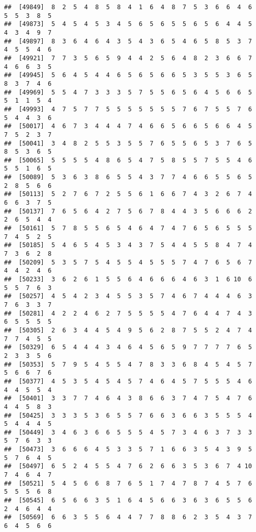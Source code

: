 \documentclass[
]{book}
\begin{document}
\begin{verbatim}
##  [49849]  8  2  5  4  8  5  8  4  1  6  4  8  7  5  3  6  6  4  6  5  5  3  8  5
##  [49873]  5  4  5  4  5  3  4  5  6  5  6  5  5  6  5  6  4  4  5  4  3  4  9  7
##  [49897]  8  3  6  4  6  4  3  5  4  3  6  5  4  6  5  8  5  3  7  4  5  5  4  6
##  [49921]  7  7  3  5  6  5  9  4  4  2  5  6  4  8  2  3  6  6  7  4  6  6  3  5
##  [49945]  5  6  4  5  4  4  6  5  6  5  6  6  5  3  5  5  3  6  5  8  3  7  4  6
##  [49969]  5  5  4  7  3  3  3  5  7  5  5  6  5  6  4  5  6  6  5  5  1  1  5  4
##  [49993]  4  7  5  7  7  5  5  5  5  5  5  5  7  6  7  5  5  7  6  5  4  4  3  6
##  [50017]  4  6  7  3  4  4  4  7  4  6  6  5  6  6  5  6  6  4  5  7  5  2  3  7
##  [50041]  3  4  8  2  5  5  3  5  5  7  6  5  5  6  5  3  7  6  5  8  5  3  6  5
##  [50065]  5  5  5  5  4  8  6  5  4  7  5  8  5  5  7  5  5  4  6  5  5  1  6  5
##  [50089]  5  3  6  3  8  6  5  5  4  3  7  7  4  6  6  5  5  6  5  2  8  5  6  6
##  [50113]  5  2  7  6  7  2  5  5  6  1  6  6  7  4  3  2  6  7  4  6  6  3  7  5
##  [50137]  7  6  5  6  4  2  7  5  6  7  8  4  4  3  5  6  6  6  2  2  6  5  4  4
##  [50161]  5  7  8  5  5  6  5  4  6  4  7  4  7  6  5  6  5  5  5  7  4  5  2  5
##  [50185]  5  4  6  5  4  5  3  4  3  7  5  4  4  5  5  8  4  7  4  7  3  6  2  8
##  [50209]  5  3  5  7  5  4  5  5  4  5  5  5  7  4  7  6  5  6  7  4  4  2  4  6
##  [50233]  3  6  2  6  1  5  5  6  4  6  6  6  4  6  3  1  6 10  6  5  5  7  6  3
##  [50257]  4  5  4  2  3  4  5  5  3  5  7  4  6  7  4  4  4  6  3  7  6  3  3  7
##  [50281]  4  2  2  4  6  2  7  5  5  5  5  4  7  6  4  4  7  4  3  6  5  5  5  5
##  [50305]  2  6  3  4  4  5  4  9  5  6  2  8  7  5  5  2  4  7  4  7  7  4  5  5
##  [50329]  6  5  4  4  4  3  4  6  4  5  6  5  9  7  7  7  7  6  5  2  3  3  5  6
##  [50353]  5  7  9  5  4  5  5  4  7  8  3  3  6  8  4  5  4  5  7  5  6  6  7  6
##  [50377]  4  5  3  5  4  5  4  5  7  4  6  4  5  7  5  5  5  4  6  4  4  5  5  4
##  [50401]  3  3  7  7  4  6  4  3  8  6  6  3  7  4  7  5  4  7  6  4  4  5  8  3
##  [50425]  3  3  3  5  3  6  5  5  7  6  6  3  6  6  3  5  5  5  4  5  4  4  4  5
##  [50449]  3  4  6  3  6  6  5  5  5  4  5  7  3  4  6  3  7  3  3  5  7  6  3  3
##  [50473]  3  6  6  6  4  5  3  3  5  7  1  6  6  3  5  4  3  9  5  5  7  6  4  5
##  [50497]  6  5  2  4  5  5  4  7  6  2  6  6  3  5  3  6  7  4 10  7  4  6  4  7
##  [50521]  5  4  5  6  6  8  7  6  5  1  7  4  7  8  7  4  5  7  6  5  5  5  6  8
##  [50545]  6  5  6  6  3  5  1  6  4  5  6  6  3  6  3  6  5  5  6  2  4  6  4  4
##  [50569]  6  6  3  5  5  6  4  4  7  7  8  8  6  2  3  5  4  3  7  6  4  5  6  6

\end{verbatim}
\end{document}
